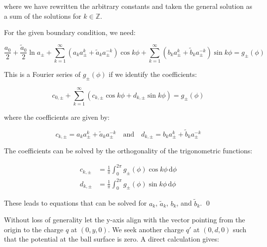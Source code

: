 \documentclass[12pt]{article}
\begin{document}
where we have rewritten the arbitrary constants and taken the general solution as a sum of the solutions for $k \in \mathbb{Z}$.

For the given boundary condition, we need:

\begin{equation}
    \frac{a_{0}}{2} + \frac{\tilde{a}_{0}}{2} \ln{a_{\pm}} + \sum_{k = 1}^{\infty} \left( a_{k} a_{\pm}^{k} + \tilde{a}_{k} a_{\pm}^{-k} \right) \cos{k \phi} + \sum_{k = 1}^{\infty} \left( b_{k} a_{\pm}^{k} + \tilde{b}_{k} a_{\pm}^{-k} \right) \sin{k \phi} = g_{\pm}(\phi)
\end{equation}

This is a Fourier series of $g_{\pm}(\phi)$ if we identify the coefficients:

\begin{equation}
    c_{0, \pm} + \sum_{k = 1}^{\infty} \left( c_{k, \pm} \cos{k \phi} + d_{k, \pm} \sin{k \phi} \right) = g_{\pm}(\phi)
\end{equation}

where the coefficients are given by:

\begin{equation}
    c_{k, \pm} = a_{k} a_{\pm}^{k} + \tilde{a}_{k} a_{\pm}^{-k} \quad \text{and} \quad d_{k, \pm} = b_{k} a_{\pm}^{k} + \tilde{b}_{k} a_{\pm}^{-k}
\end{equation}

The coefficients can be solved by the orthogonality of the trigonometric functions:

\begin{equation}
    \begin{split}
        c_{k, \pm} &= \frac{1}{\pi} \int_{0}^{2 \pi} g_{\pm}(\phi) \cos{k \phi} \, \mathrm{d} \phi \\
        d_{k, \pm} &= \frac{1}{\pi} \int_{0}^{2 \pi} g_{\pm}(\phi) \sin{k \phi} \, \mathrm{d} \phi
    \end{split}
\end{equation}

These leads to equations that can be solved for $a_{k}$, $\tilde{a}_{k}$, $b_{k}$, and $\tilde{b}_{k}$.
\qed



Without loss of generality let the y-axis align with the vector pointing from the origin to the charge $q$ at $(0, y, 0)$. We seek another charge $q'$ at $(0, d, 0)$ such that the potential at the ball surface is zero. A direct calculation gives:
\end{document}
